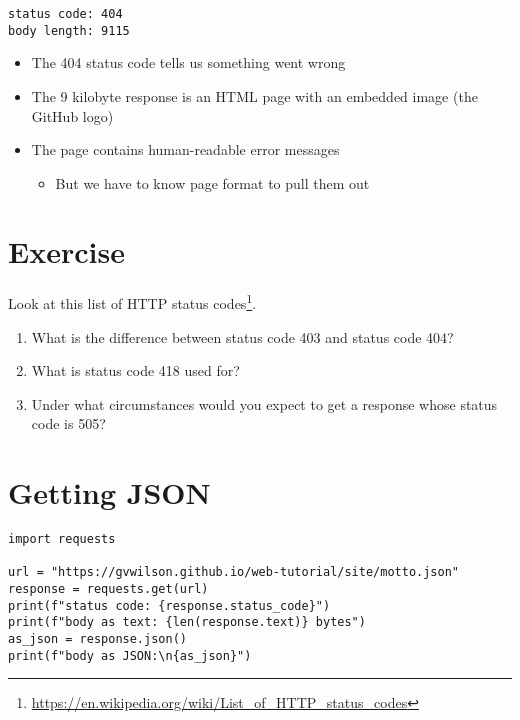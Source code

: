 \documentclass[krantzl]{krantz}
\newcommand{\hreffoot}[2]{{#1}\footnote{\href{#2}{#2}}}
\begin{document}
\begin{lstlisting}[frame=tblr,backgroundcolor=\color{black!5}]
status code: 404
body length: 9115
\end{lstlisting}

\begin{itemize}
\item The 404 status code tells us something went wrong

\item The 9 kilobyte response is an HTML page with an embedded image (the GitHub logo)

\item The page contains human-readable error messages\begin{itemize}
\item But we have to know page format to pull them out

\end{itemize}


\end{itemize}
\section{Exercise}

Look at \hreffoot{this list of HTTP status codes}{https://en.wikipedia.org/wiki/List_of_HTTP_status_codes}.

\begin{enumerate}
\item 

What is the difference between status code 403 and status code 404?



\item 

What is status code 418 used for?



\item 

Under what circumstances would you expect to get a response whose status code is 505?



\end{enumerate}
\section{Getting JSON}
\begin{lstlisting}[frame=tblr]
import requests

url = "https://gvwilson.github.io/web-tutorial/site/motto.json"
response = requests.get(url)
print(f"status code: {response.status_code}")
print(f"body as text: {len(response.text)} bytes")
as_json = response.json()
print(f"body as JSON:\n{as_json}")
\end{lstlisting}
\end{document}
